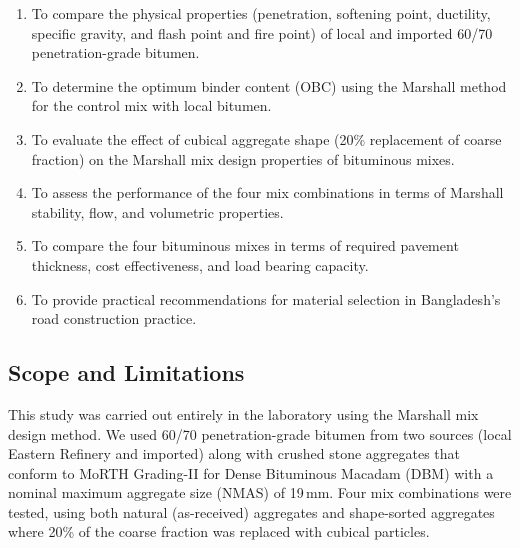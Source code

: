 \documentclass[12pt,a4paper]{article}
\begin{document}
\begin{enumerate}[label=\roman*.]
    \item To compare the physical properties (penetration, softening point, ductility, specific gravity, and flash point and fire point) of local and imported 60/70 penetration-grade bitumen.
    \item To determine the optimum binder content (OBC) using the Marshall method for the control mix with local bitumen.
    \item To evaluate the effect of cubical aggregate shape (20\% replacement of coarse fraction) on the Marshall mix design properties of bituminous mixes.
    \item To assess the performance of the four mix combinations in terms of Marshall stability, flow, and volumetric properties.
    \item To compare the four bituminous mixes in terms of required pavement thickness, cost effectiveness, and load bearing capacity.
    \item To provide practical recommendations for material selection in Bangladesh's road construction practice.
\end{enumerate}

\subsection{Scope and Limitations}

This study was carried out entirely in the laboratory using the Marshall mix design method. We used 60/70 penetration-grade bitumen from two sources (local Eastern Refinery and imported) along with crushed stone aggregates that conform to MoRTH Grading-II for Dense Bituminous Macadam (DBM) with a nominal maximum aggregate size (NMAS) of 19\,mm. Four mix combinations were tested, using both natural (as-received) aggregates and shape-sorted aggregates where 20\% of the coarse fraction was replaced with cubical particles.
\end{document}

